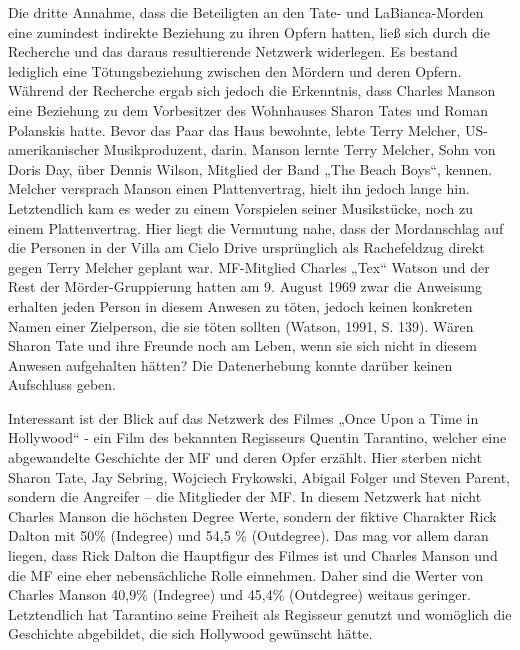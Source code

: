 \documentclass[
]{article}
\begin{document}
Die dritte Annahme, dass die Beteiligten an den Tate- und
LaBianca-Morden eine zumindest indirekte Beziehung zu ihren Opfern
hatten, ließ sich durch die Recherche und das daraus resultierende
Netzwerk widerlegen. Es bestand lediglich eine Tötungsbeziehung zwischen
den Mördern und deren Opfern. Während der Recherche ergab sich jedoch
die Erkenntnis, dass Charles Manson eine Beziehung zu dem Vorbesitzer
des Wohnhauses Sharon Tates und Roman Polanskis hatte. Bevor das Paar
das Haus bewohnte, lebte Terry Melcher, US-amerikanischer
Musikproduzent, darin. Manson lernte Terry Melcher, Sohn von Doris Day,
über Dennis Wilson, Mitglied der Band „The Beach Boys``, kennen. Melcher
versprach Manson einen Plattenvertrag, hielt ihn jedoch lange hin.
Letztendlich kam es weder zu einem Vorspielen seiner Musikstücke, noch
zu einem Plattenvertrag. Hier liegt die Vermutung nahe, dass der
Mordanschlag auf die Personen in der Villa am Cielo Drive ursprünglich
als Rachefeldzug direkt gegen Terry Melcher geplant war. MF-Mitglied
Charles „Tex`` Watson und der Rest der Mörder-Gruppierung hatten am 9.
August 1969 zwar die Anweisung erhalten jeden Person in diesem Anwesen
zu töten, jedoch keinen konkreten Namen einer Zielperson, die sie töten
sollten (Watson, 1991, S. 139). Wären Sharon Tate und ihre Freunde noch
am Leben, wenn sie sich nicht in diesem Anwesen aufgehalten hätten? Die
Datenerhebung konnte darüber keinen Aufschluss geben.

Interessant ist der Blick auf das Netzwerk des Filmes „Once Upon a Time
in Hollywood`` - ein Film des bekannten Regisseurs Quentin Tarantino,
welcher eine abgewandelte Geschichte der MF und deren Opfer erzählt.
Hier sterben nicht Sharon Tate, Jay Sebring, Wojciech Frykowski, Abigail
Folger und Steven Parent, sondern die Angreifer -- die Mitglieder der
MF. In diesem Netzwerk hat nicht Charles Manson die höchsten Degree
Werte, sondern der fiktive Charakter Rick Dalton mit 50\% (Indegree) und
54,5 \% (Outdegree). Das mag vor allem daran liegen, dass Rick Dalton
die Hauptfigur des Filmes ist und Charles Manson und die MF eine eher
nebensächliche Rolle einnehmen. Daher sind die Werter von Charles Manson
40,9\% (Indegree) und 45,4\% (Outdegree) weitaus geringer. Letztendlich
hat Tarantino seine Freiheit als Regisseur genutzt und womöglich die
Geschichte abgebildet, die sich Hollywood gewünscht hätte.
\end{document}
